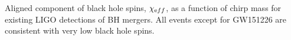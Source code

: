  \label{fig:BHspin} Aligned component of black hole spins, $\chi_{\textrm eff}$, as a function of chirp mass for existing LIGO detections of BH mergers. All events except for GW151226 are consistent with very low black hole spins.